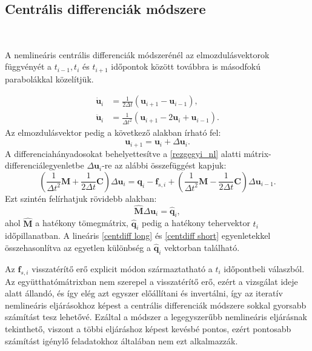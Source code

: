\subsection{Centrális differenciák módszere}

{\ }

A nemlineáris centrális differenciák módszerénél \cite{chopra} az elmozdulásvektorok függvényét a $t_{i-1}, t_i$ és $t_{i+1}$ időpontok között továbbra is  másodfokú parabolákkal közelítjük.

\begin{align*}
\label{centdiff_av}
\mathbf{\dot{u}}_i&=\frac{1}{2\Delta{t}}\left(\mathbf{u}_{i+1}-\mathbf{u}_{i-1}\right), \\
\mathbf{\ddot{u}}_i&=\frac{1}{\Delta{t}^2}\left(\mathbf{u}_{i+1}-2\mathbf{u}_i+\mathbf{u}_{i-1}\right).
\end{align*}
Az elmozdulásvektor pedig a következő alakban írható fel:
\begin{equation}
\mathbf{u}_{i+1} = \mathbf{u}_i+\Delta{\mathbf{u}}_i.
\end{equation}
A differenciahányadosokat behelyettesítve a \eqref{rezgegyi_nl} alatti mátrix-differenciálegyenletbe $\Delta{\mathbf{u}}_{i}$-re az alábbi összefüggést kapjuk:
\begin{equation}
\label{centdiff_nl}
\left(\frac{1}{\Delta{t}^2}\mathbf{M}+\frac{1}{2\Delta{t}}\mathbf{C}\right)\Delta{\mathbf{u}}_{i} = \mathbf{q}_i-\mathbf{f}_{s,i}+\left(\frac{1}{\Delta{t}^2}\mathbf{M}-\frac{1}{2\Delta{t}}\mathbf{C}\right)\Delta{\mathbf{u}}_{i-1}.
\end{equation}
Ezt szintén felírhatjuk rövidebb alakban:
\begin{equation}
\mathbf{\hat{M}}\Delta{\mathbf{u}}_i = \mathbf{\hat{q}}_i,
\end{equation}
ahol $\mathbf{\hat{M}}$ a hatékony tömegmátrix, $\mathbf{\hat{q}}_i$ pedig a hatékony tehervektor $t_i$ időpillanatban. A lineáris \eqref{centdiff long} és \eqref{centdiff short} egyenletekkel összehasonlítva az egyetlen különbség a $\mathbf{\hat{q}}_i$ vektorban található. 

Az $\mathbf{f}_{s,i}$ visszatérítő erő explicit módon származtatható a $t_i$ időpontbeli válaszból. Az együtthatómátrixban  nem szerepel a visszatérítő erő, ezért a vizsgálat ideje alatt állandó, és így elég azt  egyszer előállítani és invertálni, így az iteratív  nemlineáris eljárásokhoz képest a centrális differenciák módszere sokkal gyorsabb számítást tesz lehetővé. Ezáltal a módszer a legegyszerűbb nemlineáris eljárásnak tekinthető, viszont a többi eljáráshoz képest kevésbé pontos, ezért pontosabb számítást igénylő feladatokhoz általában nem ezt alkalmazzák.


